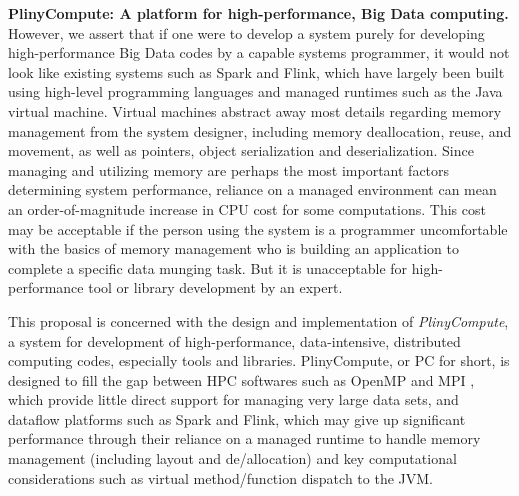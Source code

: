 \vspace{5 pt}
\noindent
\textbf{PlinyCompute: A platform for high-performance, Big Data computing.}
However, we assert that if one were to develop a system purely for developing high-performance
Big Data codes
by a capable systems programmer,
it would not look like existing systems such as Spark and Flink,
which have largely 
been built using high-level programming languages and managed runtimes such as the Java 
virtual machine.  Virtual machines abstract away
most details regarding memory management
from the system designer, including memory deallocation, reuse, and movement, as well as pointers,
object serialization and deserialization.
Since managing and utilizing memory are 
perhaps the most important factors determining system performance, reliance
on a managed environment can mean an order-of-magnitude increase in CPU cost for some computations.  
This cost may be acceptable if the person using the system
is a programmer uncomfortable with the basics of memory management who is
building an application to complete a specific data munging task.  
But it is unacceptable for high-performance tool or library development by an expert.

This proposal is concerned with the design and implementation of
\emph{PlinyCompute}, a system for development of
high-performance, data-intensive, distributed computing codes, especially tools and libraries.
PlinyCompute, or PC for short, is designed to fill the gap between 
HPC softwares such as OpenMP \cite{dagum1998openmp} and MPI \cite{gropp1996high}, which provide little direct support for
managing very large data sets, and dataflow platforms such as Spark and Flink, which 
may give up significant performance through their reliance on a managed runtime to handle
memory management (including layout and de/allocation) and key computational considerations
such as virtual method/function dispatch to the JVM. 

